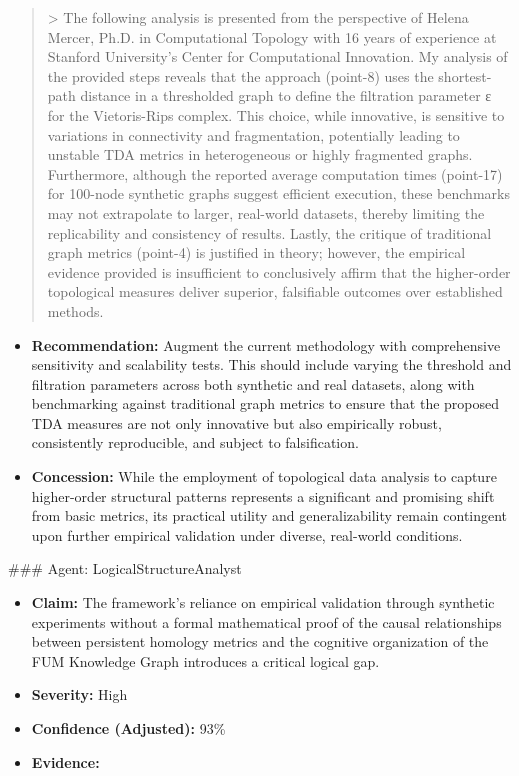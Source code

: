 \documentclass[12pt]{article}
\begin{document}
\begin{quote}
> The following analysis is presented from the perspective of Helena Mercer, Ph.D. in Computational Topology with 16 years of experience at Stanford University’s Center for Computational Innovation. My analysis of the provided steps reveals that the approach (point-8) uses the shortest-path distance in a thresholded graph to define the filtration parameter ε for the Vietoris-Rips complex. This choice, while innovative, is sensitive to variations in connectivity and fragmentation, potentially leading to unstable TDA metrics in heterogeneous or highly fragmented graphs. Furthermore, although the reported average computation times (point-17) for 100-node synthetic graphs suggest efficient execution, these benchmarks may not extrapolate to larger, real-world datasets, thereby limiting the replicability and consistency of results. Lastly, the critique of traditional graph metrics (point-4) is justified in theory; however, the empirical evidence provided is insufficient to conclusively affirm that the higher-order topological measures deliver superior, falsifiable outcomes over established methods.
\end{quote}
\begin{itemize}
  \item \textbf{Recommendation:} Augment the current methodology with comprehensive sensitivity and scalability tests. This should include varying the threshold and filtration parameters across both synthetic and real datasets, along with benchmarking against traditional graph metrics to ensure that the proposed TDA measures are not only innovative but also empirically robust, consistently reproducible, and subject to falsification.
  \item \textbf{Concession:} While the employment of topological data analysis to capture higher-order structural patterns represents a significant and promising shift from basic metrics, its practical utility and generalizability remain contingent upon further empirical validation under diverse, real-world conditions.
\end{itemize}
\hrulefill
\#\#\# Agent: LogicalStructureAnalyst
\begin{itemize}
  \item \textbf{Claim:} The framework’s reliance on empirical validation through synthetic experiments without a formal mathematical proof of the causal relationships between persistent homology metrics and the cognitive organization of the FUM Knowledge Graph introduces a critical logical gap.
  \item \textbf{Severity:} High
  \item \textbf{Confidence (Adjusted):} 93\%
  \item \textbf{Evidence:}
\end{itemize}
\end{document}
